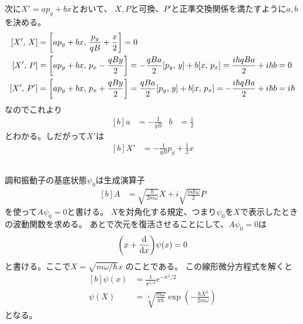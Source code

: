 \documentclass[../../master.tex]{subfiles}
\begin{document}
次に\(X' = ap_y+bx\)とおいて、
\(X,P\)と可換、\(P'\)と正準交換関係を満たすように\(a,b\)を決める。
\begin{equation}\begin{aligned}[b]
    [X',\,X] &= \qty[ap_y+bx,\,\frac{p_y}{qB}+\frac{x}{2}]
    =0\\
    [X',\,P] &= \qty[ap_y+bx,\,p_x-\frac{qBy}{2}] = -\frac{qBa}{2}[p_y,\,y]+b[x,\,p_x] = \frac{i\hbar qBa}{2} + i\hbar b  = 0\\
    [X',\,P'] &= \qty[ap_y+bx,\,p_x+\frac{qBy}{2}] = \frac{qBa}{2}[p_y,\,y]+b[x,\,p_x] = - \frac{i\hbar qBa}{2} + i\hbar b = i\hbar\\
\end{aligned}\end{equation}
なのでこれより
\begin{equation}\begin{aligned}[b]
    a &=  -\frac{1}{qB} & b&= \frac{1}{2}
\end{aligned}\end{equation}
とわかる。しだがって\(X'\)は
\begin{equation}\begin{aligned}[b]
    X' &= -\frac{1}{qB}p_y + \frac{1}{2}x
\end{aligned}\end{equation}

\subsection{}
調和振動子の基底状態\(\psi_0\)は生成演算子
\begin{equation}\begin{aligned}[b]
    A &= \sqrt{\frac{\hbar}{2m\omega}}X + i\sqrt{\frac{m\hbar\omega}{2}}P
\end{aligned}\end{equation}
を使って\(A\psi_0 = 0\)と書ける。
\(X\)を対角化する規定、つまり\(\psi_0\)を\(X\)で表示したときの波動関数を求める。
あとで次元を復活させることにして、\(A\psi_0 = 0\)は
\begin{equation}\begin{aligned}[b]
    \qty(x+\dv{x})\psi(x) = 0
\end{aligned}\end{equation}
と書ける。ここで\(X = \sqrt{m\omega/\hbar} x\) のことである。
この線形微分方程式を解くと
\begin{equation}\begin{aligned}[b]
    \psi(x) &= \frac{1}{\pi^{1/4}}e^{-x^2/2}\\
    \psi(X) &= \sqrt[4]{\frac{m\omega}{\pi \hbar}} \exp(-\frac{\hbar X^2}{2m\omega})
\end{aligned}\end{equation}
となる。
\end{document}

